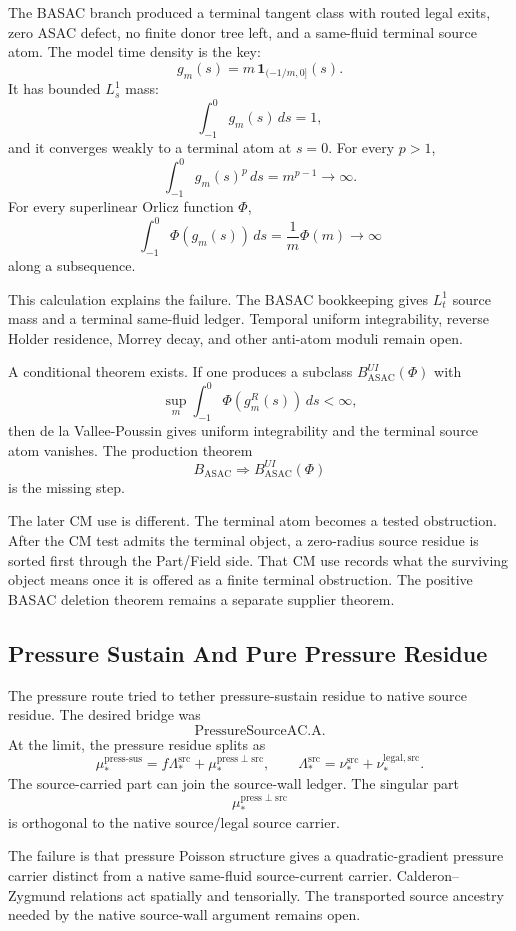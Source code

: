 The BASAC branch produced a terminal tangent class with routed legal exits,
zero ASAC defect, no finite donor tree left, and a same-fluid terminal source
atom.
The model time density is the key:
\[
  g_m(s)=m\,\mathbf 1_{(-1/m,0]}(s).
\]
It has bounded \(L_s^1\) mass:
\[
  \int_{-1}^0 g_m(s)\,ds=1,
\]
and it converges weakly to a terminal atom at \(s=0\).
For every \(p>1\),
\[
  \int_{-1}^0 g_m(s)^p\,ds
  =
  m^{p-1}
  \to\infty .
\]
For every superlinear Orlicz function \(\Phi\),
\[
  \int_{-1}^0\Phi(g_m(s))\,ds
  =
  \frac1m\Phi(m)
  \to\infty
\]
along a subsequence.

This calculation explains the failure.
The BASAC bookkeeping gives \(L^1_t\) source mass and a terminal same-fluid
ledger.
Temporal uniform integrability, reverse Holder residence, Morrey decay, and
other anti-atom moduli remain open.

A conditional theorem exists.
If one produces a subclass \(B_{\mathrm{ASAC}}^{UI}(\Phi)\) with
\[
  \sup_m\int_{-1}^0\Phi(g_m^R(s))\,ds<\infty ,
\]
then de la Vallee-Poussin gives uniform integrability and the terminal source
atom vanishes.
The production theorem
\[
  B_{\mathrm{ASAC}}\Longrightarrow B_{\mathrm{ASAC}}^{UI}(\Phi)
\]
is the missing step.

The later CM use is different.
The terminal atom becomes a tested obstruction.
After the CM test admits the terminal object, a zero-radius source residue is
sorted first through the Part/Field side.
That CM use records what the surviving object means once it is offered as a
finite terminal obstruction.
The positive BASAC deletion theorem remains a separate supplier theorem.

\subsection{Pressure Sustain And Pure Pressure Residue}

The pressure route tried to tether pressure-sustain residue to native source
residue.
The desired bridge was
\[
  \text{PressureSourceAC.A}.
\]
At the limit, the pressure residue splits as
\[
  \mu_*^{\mathrm{press\text{-}sus}}
  =
  f\Lambda_*^{\mathrm{src}}
  +
  \mu_*^{\mathrm{press}\perp\mathrm{src}},
  \qquad
  \Lambda_*^{\mathrm{src}}
  =
  \nu_*^{\mathrm{src}}+\nu_*^{\mathrm{legal,src}} .
\]
The source-carried part can join the source-wall ledger.
The singular part
\[
  \mu_*^{\mathrm{press}\perp\mathrm{src}}
\]
is orthogonal to the native source/legal source carrier.

The failure is that pressure Poisson structure gives a quadratic-gradient
pressure carrier distinct from a native same-fluid source-current carrier.
Calderon--Zygmund relations act spatially and tensorially.
The transported source ancestry needed by the native source-wall argument
remains open.

